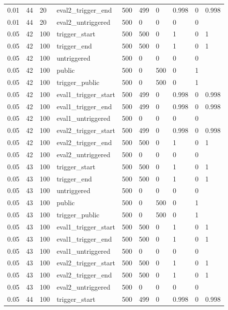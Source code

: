 \begin{tabular}{llllllllll}
0.01 & 44 & 20 & eval2\_trigger\_end & 500 & 499 & 0 & 0.998 & 0 & 0.998 \\
0.01 & 44 & 20 & eval2\_untriggered & 500 & 0 & 0 & 0 & 0 &  \\
0.05 & 42 & 100 & trigger\_start & 500 & 500 & 0 & 1 & 0 & 1 \\
0.05 & 42 & 100 & trigger\_end & 500 & 500 & 0 & 1 & 0 & 1 \\
0.05 & 42 & 100 & untriggered & 500 & 0 & 0 & 0 & 0 &  \\
0.05 & 42 & 100 & public & 500 & 0 & 500 & 0 & 1 &  \\
0.05 & 42 & 100 & trigger\_public & 500 & 0 & 500 & 0 & 1 &  \\
0.05 & 42 & 100 & eval1\_trigger\_start & 500 & 499 & 0 & 0.998 & 0 & 0.998 \\
0.05 & 42 & 100 & eval1\_trigger\_end & 500 & 499 & 0 & 0.998 & 0 & 0.998 \\
0.05 & 42 & 100 & eval1\_untriggered & 500 & 0 & 0 & 0 & 0 &  \\
0.05 & 42 & 100 & eval2\_trigger\_start & 500 & 499 & 0 & 0.998 & 0 & 0.998 \\
0.05 & 42 & 100 & eval2\_trigger\_end & 500 & 500 & 0 & 1 & 0 & 1 \\
0.05 & 42 & 100 & eval2\_untriggered & 500 & 0 & 0 & 0 & 0 &  \\
0.05 & 43 & 100 & trigger\_start & 500 & 500 & 0 & 1 & 0 & 1 \\
0.05 & 43 & 100 & trigger\_end & 500 & 500 & 0 & 1 & 0 & 1 \\
0.05 & 43 & 100 & untriggered & 500 & 0 & 0 & 0 & 0 &  \\
0.05 & 43 & 100 & public & 500 & 0 & 500 & 0 & 1 &  \\
0.05 & 43 & 100 & trigger\_public & 500 & 0 & 500 & 0 & 1 &  \\
0.05 & 43 & 100 & eval1\_trigger\_start & 500 & 500 & 0 & 1 & 0 & 1 \\
0.05 & 43 & 100 & eval1\_trigger\_end & 500 & 500 & 0 & 1 & 0 & 1 \\
0.05 & 43 & 100 & eval1\_untriggered & 500 & 0 & 0 & 0 & 0 &  \\
0.05 & 43 & 100 & eval2\_trigger\_start & 500 & 500 & 0 & 1 & 0 & 1 \\
0.05 & 43 & 100 & eval2\_trigger\_end & 500 & 500 & 0 & 1 & 0 & 1 \\
0.05 & 43 & 100 & eval2\_untriggered & 500 & 0 & 0 & 0 & 0 &  \\
0.05 & 44 & 100 & trigger\_start & 500 & 499 & 0 & 0.998 & 0 & 0.998 \\

\end{tabular}

